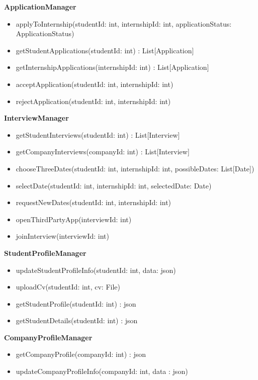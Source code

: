 \textbf{ApplicationManager}
\begin{itemize}
    \item applyToInternship(studentId: int, internshipId: int, applicationStatus: ApplicationStatus) %
    \item getStudentApplications(studentId: int) : List[Application] %
    \item getInternshipApplications(internshipId: int) : List[Application] %
    \item acceptApplication(studentId: int, internshipId: int)
    \item rejectApplication(studentId: int, internshipId: int)
\end{itemize}

\textbf{InterviewManager}
\begin{itemize}
    \item getStudentInterviews(studentId: int) : List[Interview]
    \item getCompanyInterviews(companyId: int) : List[Interview]
    \item chooseThreeDates(studentId: int, internshipId: int, possibleDates: List[Date])
    \item selectDate(studentId: int, internshipId: int, selectedDate: Date)
    \item requestNewDates(studentId: int, internshipId: int)
    \item openThirdPartyApp(interviewId: int)
    \item joinInterview(interviewId: int)
\end{itemize}

\newpage
\textbf{StudentProfileManager}
\begin{itemize}
    \item updateStudentProfileInfo(studentId: int, data: json)
    \item uploadCv(studentId: int, cv: File)
    \item getStudentProfile(studentId: int) : json %
    \item getStudentDetails(studentId: int) : json %
\end{itemize}

\textbf{CompanyProfileManager}
\begin{itemize}
    \item getCompanyProfile(companyId: int) : json
    \item updateCompanyProfileInfo(companyId: int, data : json)
\end{itemize}

